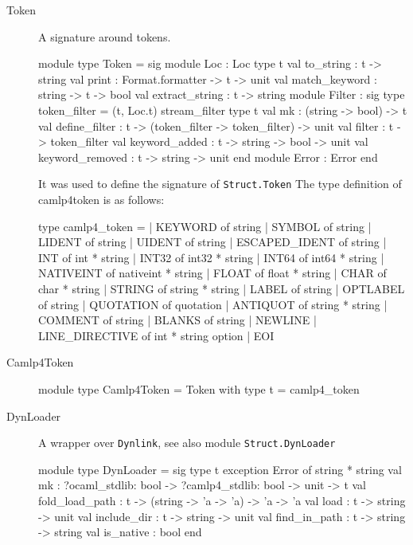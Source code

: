 \begin{description}
\item[Token] A signature around tokens.
\begin{ocamlcode}
  module type Token =
  sig
    module Loc : Loc
    type t
    val to_string : t -> string
    val print : Format.formatter -> t -> unit
    val match_keyword : string -> t -> bool
    val extract_string : t -> string
    module Filter :
      sig
        type token_filter = (t, Loc.t) stream_filter
        type t
        val mk : (string -> bool) -> t
        val define_filter : t -> (token_filter -> token_filter) -> unit
        val filter : t -> token_filter
        val keyword_added : t -> string -> bool -> unit
        val keyword_removed : t -> string -> unit
      end
    module Error : Error
  end
\end{ocamlcode}

It was used to define the signature of \verb|Struct.Token|
The type definition of camlp4token is as follows:

\begin{ocamlcode}
type camlp4_token =
  | KEYWORD of string
  | SYMBOL of string
  | LIDENT of string
  | UIDENT of string
  | ESCAPED_IDENT of string
  | INT of int * string
  | INT32 of int32 * string
  | INT64 of int64 * string
  | NATIVEINT of nativeint * string
  | FLOAT of float * string
  | CHAR of char * string
  | STRING of string * string
  | LABEL of string
  | OPTLABEL of string
  | QUOTATION of quotation
  | ANTIQUOT of string * string
  | COMMENT of string
  | BLANKS of string
  | NEWLINE
  | LINE_DIRECTIVE of int * string option
  | EOI  
\end{ocamlcode}

\item[Camlp4Token]

  \begin{ocamlcode}
  module type Camlp4Token = Token with type t = camlp4_token  
  \end{ocamlcode}

\item[DynLoader] A wrapper over \verb|Dynlink|, see also module
  \verb|Struct.DynLoader|

  \begin{ocamlcode}
    module type DynLoader =  sig
    type t
    exception Error of string * string
    val mk : ?ocaml_stdlib: bool -> ?camlp4_stdlib: bool -> unit -> t
    val fold_load_path : t -> (string -> 'a -> 'a) -> 'a -> 'a
    val load : t -> string -> unit
    val include_dir : t -> string -> unit
    val find_in_path : t -> string -> string
    val is_native : bool
  end
  \end{ocamlcode}


\end{description}
